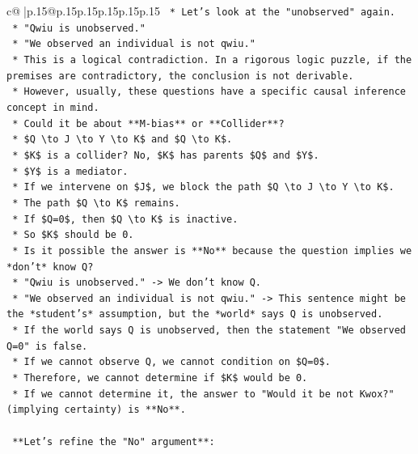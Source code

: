 \documentclass{article}
\begin{document}
{\begin{supertabular}{c@{$\;$}|p{.15\linewidth}@{}p{.15\linewidth}p{.15\linewidth}p{.15\linewidth}p{.15\linewidth}p{.15\linewidth}}
{{{\texttt{    *   Let's look at the "unobserved" again.} \\
\texttt{    *   "Qwiu is unobserved."} \\
\texttt{    *   "We observed an individual is not qwiu."} \\
\texttt{    *   This is a logical contradiction. In a rigorous logic puzzle, if the premises are contradictory, the conclusion is not derivable.} \\
\texttt{    *   However, usually, these questions have a specific causal inference concept in mind.} \\
\texttt{    *   Could it be about **M{-}bias** or **Collider**?} \\
\texttt{    *   \$Q \textbackslash{}to J \textbackslash{}to Y \textbackslash{}to K\$ and \$Q \textbackslash{}to K\$.} \\
\texttt{    *   \$K\$ is a collider? No, \$K\$ has parents \$Q\$ and \$Y\$.} \\
\texttt{    *   \$Y\$ is a mediator.} \\
\texttt{    *   If we intervene on \$J\$, we block the path \$Q \textbackslash{}to J \textbackslash{}to Y \textbackslash{}to K\$.} \\
\texttt{    *   The path \$Q \textbackslash{}to K\$ remains.} \\
\texttt{    *   If \$Q=0\$, then \$Q \textbackslash{}to K\$ is inactive.} \\
\texttt{    *   So \$K\$ should be 0.} \\
\texttt{    *   Is it possible the answer is **No** because the question implies we *don't* know Q?} \\
\texttt{    *   "Qwiu is unobserved." {-}> We don't know Q.} \\
\texttt{    *   "We observed an individual is not qwiu." {-}> This sentence might be the *student's* assumption, but the *world* says Q is unobserved.} \\
\texttt{    *   If the world says Q is unobserved, then the statement "We observed Q=0" is false.} \\
\texttt{    *   If we cannot observe Q, we cannot condition on \$Q=0\$.} \\
\texttt{    *   Therefore, we cannot determine if \$K\$ would be 0.} \\
\texttt{    *   If we cannot determine it, the answer to "Would it be not Kwox?" (implying certainty) is **No**.} \\
\\ 
\texttt{    **Let's refine the "No" argument**:} \\
}}}
\end{supertabular}}
\end{document}
